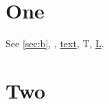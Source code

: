 \documentclass{article}
\begin{document}
\section{One}
See \autoref{sec:b}, , \hyperref[sec:b]{text}, \hypertarget{tg}{T}, \hyperlink{tg}{L}.
\section{Two}\label{sec:b}
\end{document}

